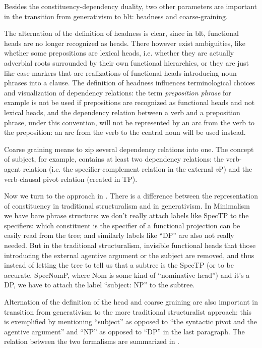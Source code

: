 \documentclass[UTF8, a4paper, oneside, scheme=plain, 12pt]{ctexbook}
\newcommand*{\term}[1]{\emph{#1}}
\newcommand{\vP}{\textit{v}P}
\begin{document}
{Besides the constituency-dependency duality, 
two other parameters are important in the transition from generativism to \ac{blt}:
headness and coarse-graining. 

The alternation of the definition of headness is clear, 
since in \ac{blt}, 
functional heads are no longer recognized as heads.
There however exist ambiguities, 
like whether some prepositions are lexical heads,
i.e. whether they are actually adverbial roots surrounded by 
their own functional hierarchies, 
or they are just like case markers 
that are realizations of functional heads
introducing noun phrases into a clause.
The definition of headness influences terminological choices 
and visualization of dependency relations:
the term \term{preposition phrase} for example is not be used
if prepositions are recognized as functional heads and not lexical heads, 
and the dependency relation between a verb and a preposition phrase, 
under this convention,
will not be represented by an arc from the verb to the preposition: 
an arc from the verb to the central noun will be used instead.

Coarse graining means to zip several dependency relations into one. 
The concept of subject, for example, 
contains at least two dependency relations: 
the verb-agent relation (i.e. the specifier-complement relation in the external \vP)
and the verb-clausal pivot relation (created in TP).


Now we turn to the approach in \citet{cgel}. 
There is a difference between the representation of constituency
in traditional structuralism and in generativism.
In Minimalism we have bare phrase structure: 
we don't really attach labels like SpecTP 
to the specifiers: 
which constituent is the specifier of a functional projection 
can be easily read from the tree; 
and similarly labels like ``DP'' are also not really needed.
But in the traditional structuralism, 
invisible functional heads that those introducing the external agentive argument 
or the subject are removed, 
and thus instead of letting the tree to tell us 
that a subtree is the SpecTP (or to be accurate, SpecNomP, 
where Nom is some kind of ``nominative head'') 
and it's a DP, 
we have to attach the label 
``subject: NP'' to the subtree.

Alternation of the definition of the head and coarse graining are also important 
in transition from generativism to the more traditional structuralist approach:
this is exemplified by mentioning ``subject'' 
as opposed to ``the syntactic pivot and the agentive argument''
and ``NP'' as opposed to ``DP'' in the last paragraph.
The relation between the two formalisms are summarized in .

}
\end{document}
